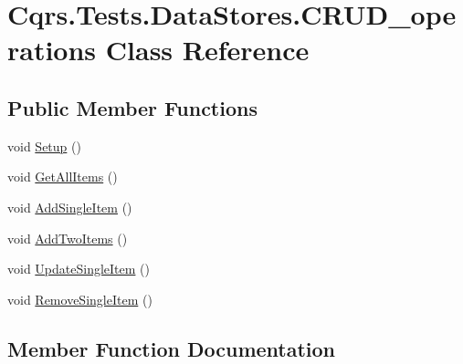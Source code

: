 \hypertarget{classCqrs_1_1Tests_1_1DataStores_1_1CRUD__operations}{}\section{Cqrs.\+Tests.\+Data\+Stores.\+C\+R\+U\+D\+\_\+operations Class Reference}
\label{classCqrs_1_1Tests_1_1DataStores_1_1CRUD__operations}
\subsection*{Public Member Functions}
\begin{DoxyCompactItemize}
\item 
void \hyperlink{classCqrs_1_1Tests_1_1DataStores_1_1CRUD__operations_a7d902349c40e057dab4f379ae17ec1b3}{Setup} ()
\item 
void \hyperlink{classCqrs_1_1Tests_1_1DataStores_1_1CRUD__operations_a1ab13a7d6951b9da63f0a5e8f34e3f0c}{Get\+All\+Items} ()
\item 
void \hyperlink{classCqrs_1_1Tests_1_1DataStores_1_1CRUD__operations_ab5e28e6ca3a7e1fc976268d407ed5b41}{Add\+Single\+Item} ()
\item 
void \hyperlink{classCqrs_1_1Tests_1_1DataStores_1_1CRUD__operations_ac1d3e0a8dbe882f1adfaa4b60ccc8688}{Add\+Two\+Items} ()
\item 
void \hyperlink{classCqrs_1_1Tests_1_1DataStores_1_1CRUD__operations_abd14b0c7589f2c4ba3aea00576881f78}{Update\+Single\+Item} ()
\item 
void \hyperlink{classCqrs_1_1Tests_1_1DataStores_1_1CRUD__operations_aa52853051c3b13619c6e59ec5c21b391}{Remove\+Single\+Item} ()
\end{DoxyCompactItemize}


\subsection{Member Function Documentation}
\mbox{\label{classCqrs_1_1Tests_1_1DataStores_1_1CRUD__operations_ab5e28e6ca3a7e1fc976268d407ed5b41}} 
